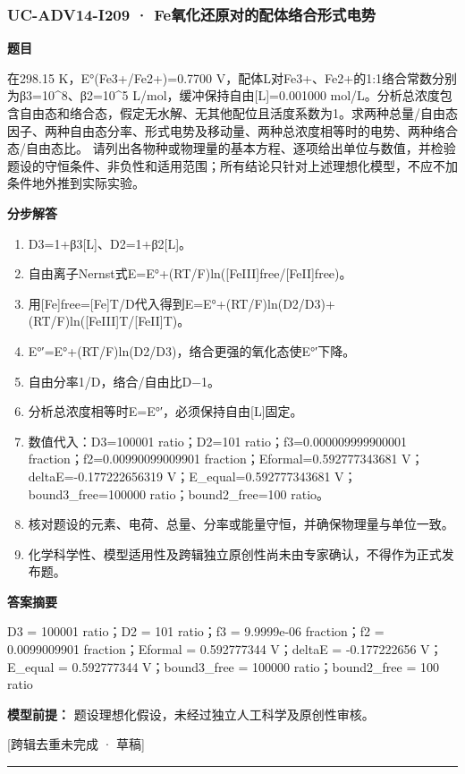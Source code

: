\documentclass[UTF8,11pt,a4paper]{ctexart}
\begin{document}
\subsubsection*{UC-ADV14-I209 · Fe氧化还原对的配体络合形式电势}
\noindent\textbf{题目}\par
在298.15 K，E°(Fe3+/Fe2+)=0.7700 V，配体L对Fe3+、Fe2+的1:1络合常数分别为β3=10\textasciicircum{}8、β2=10\textasciicircum{}5 L/mol，缓冲保持自由[L]=0.001000 mol/L。分析总浓度包含自由态和络合态，假定无水解、无其他配位且活度系数为1。求两种总量/自由态因子、两种自由态分率、形式电势及移动量、两种总浓度相等时的电势、两种络合态/自由态比。 请列出各物种或物理量的基本方程、逐项给出单位与数值，并检验题设的守恒条件、非负性和适用范围；所有结论只针对上述理想化模型，不应不加条件地外推到实际实验。\par
\medskip\noindent\textbf{分步解答}
\begin{enumerate}
\item D3=1+β3[L]、D2=1+β2[L]。
\item 自由离子Nernst式E=E°+(RT/F)ln([FeIII]free/[FeII]free)。
\item 用[Fe]free=[Fe]T/D代入得到E=E°+(RT/F)ln(D2/D3)+(RT/F)ln([FeIII]T/[FeII]T)。
\item E°′=E°+(RT/F)ln(D2/D3)，络合更强的氧化态使E°′下降。
\item 自由分率1/D，络合/自由比D−1。
\item 分析总浓度相等时E=E°′，必须保持自由[L]固定。
\item 数值代入：D3=100001 ratio；D2=101 ratio；f3=0.000009999900001 fraction；f2=0.00990099009901 fraction；Eformal=0.592777343681 V；deltaE=-0.177222656319 V；E\_equal=0.592777343681 V；bound3\_free=100000 ratio；bound2\_free=100 ratio。
\item 核对题设的元素、电荷、总量、分率或能量守恒，并确保物理量与单位一致。
\item 化学科学性、模型适用性及跨辑独立原创性尚未由专家确认，不得作为正式发布题。
\end{enumerate}
\noindent\textbf{答案摘要}\par
D3 = 100001 ratio；D2 = 101 ratio；f3 = 9.9999e-06 fraction；f2 = 0.0099009901 fraction；Eformal = 0.592777344 V；deltaE = -0.177222656 V；E\_equal = 0.592777344 V；bound3\_free = 100000 ratio；bound2\_free = 100 ratio\par
\noindent\textbf{模型前提：}
题设理想化假设，未经过独立人工科学及原创性审核。\par
\noindent\textcolor{red!65!black}{[跨辑去重未完成 · 草稿]} \par
\medskip\hrule\medskip
{}
\end{document}
